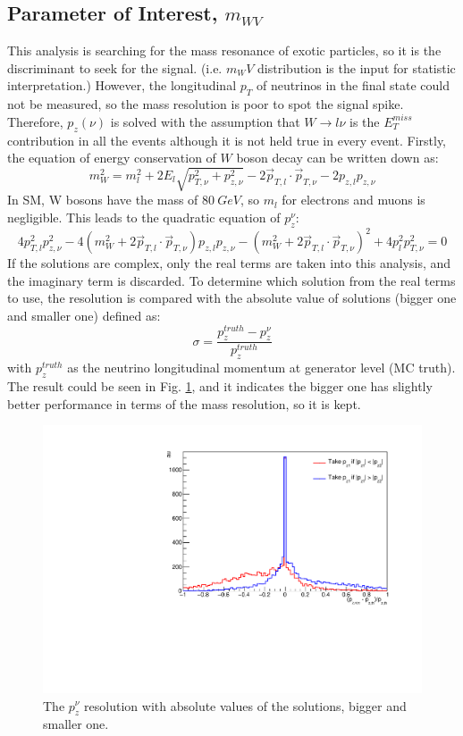 \subsection{Parameter of Interest, $m_{WV}$}
\label{Subsec:mwv}
This analysis is searching for the mass resonance of exotic particles, so it is the discriminant to seek for the signal. (i.e. $m_WV$ distribution is the input for statistic interpretation.) However, the longitudinal $p_{T}$ of neutrinos in the final state could not be measured, so the mass resolution is poor to spot the signal spike. Therefore, $p_{z}(\nu)$ is solved with the assumption that $W\rightarrow l\nu$ is the $E^{miss}_{T}$ contribution in all the events although it is not held true in every event. Firstly, the equation of energy conservation of $W$ boson decay can be written down as:
\begin{equation}
m^2_W = m_{l}^{2} + 2E_{l}\sqrt{ p_{T,\nu}^2 + p_{z,\nu}^{2} }  - 2 \vec{p}_{{T},l} \cdot \vec{p}_{T, \nu} - 2 p_{z, l} p_{z,\nu}
\end{equation}
\noindent
In SM, W bosons have the mass of $80~GeV$, so $m_{l}$ for electrons and muons is negligible. This leads to the quadratic equation of $p_{z}^\nu$:
\begin{equation}
4p_{{T}, l}^{2} p_{z,\nu}^{2} - 4 \left( m_{W}^{2} + 2 \vec{p}_{{T}, l} \cdot \vec{p}_{{T},\nu} \right) p_{z,l} p_{z, \nu} - \left( m_{W}^{2} + 2\vec{p}_{{T}, l} \cdot \vec{p}_{{T},\nu}  \right)^{2} +4p_l^{2} p_{{T},\nu}^{2} = 0
\end{equation}
\noindent
If the solutions are complex, only the real terms are taken into this analysis, and the imaginary term is discarded. To determine which solution from the real terms to use, the resolution is compared with the absolute value of solutions (bigger one and smaller one) defined as:
\begin{equation}
\sigma = \frac{p_z^{truth}-p_z^{\nu}}{p_z^{truth}}
\end{equation}
\noindent
with $p_z^{truth}$ as the neutrino longitudinal momentum at generator level (MC truth). The result could be seen in Fig. \ref{Fig:netrinoPz}, and it indicates the bigger one has slightly better performance in terms of the mass resolution, so it is kept.  
\begin{figure}
	\centering
    \includegraphics[width=0.5\hsize]{Chapter3/neutrinoPz}
    \caption{The $p_{z}^\nu$ resolution with absolute values of the solutions, bigger and smaller one. }
    \label{Fig:netrinoPz}
\end{figure}
